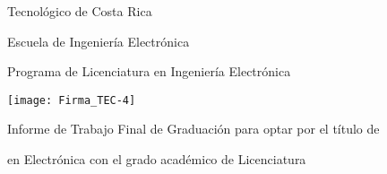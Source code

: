 {}

\thispagestyle{empty} 

\begin{center}

Tecnológico de Costa Rica

\par\vspace{1ex}

Escuela de Ingeniería Electrónica

\par\vspace{1ex}

Programa de Licenciatura en Ingeniería Electrónica

\par\vspace{20mm}

\texttt{[image: Firma\_TEC-4]}

\par\vspace*{\fill}

{\large\bf{\thesisTitle\par}}

\par\vspace*{\fill}

Informe de Trabajo Final de Graduación para optar por el título de

\thesisAuthorDegree{} en Electrónica con el grado académico de Licenciatura

\par\vspace{20mm}

\thesisAuthor

\vspace*{\fill}

\end{center}
\newpage 
\cleardoublepage 


